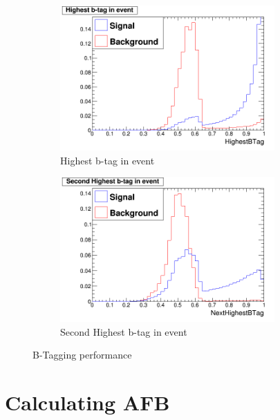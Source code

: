 \begin{figure}
  \centering
  \begin{subfigure}{.5\textwidth}
    \centering
    \includegraphics[width=0.9\textwidth]{TopAnalysis/figures/HighestBTag_SigVsBkg.png}
    \caption[Highest b-tag in event]{Highest b-tag in event}
  \end{subfigure}%
  \begin{subfigure}{.5\textwidth}
    \centering
    \includegraphics[width=0.9\textwidth]{TopAnalysis/figures/NextHighestBTag_SigVsBkg.png}
    \caption[Second Highest b-tag event in event]{Second Highest b-tag in event}
  \end{subfigure}
  \caption[B-Tagging performance]{B-Tagging performance}
  \label{fig:btagging}
\end{figure}




\section{Calculating AFB}
\label{Calculating AFB}

